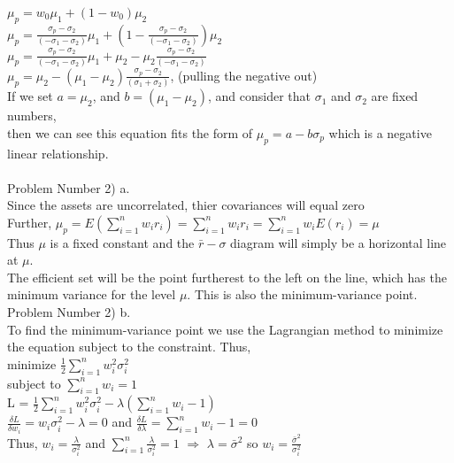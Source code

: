 \documentclass[11pt]{article}
\begin{document}
$\mu_{p} = w_{0}\mu_{1} + (1-w_{0})\mu_{2}$\\
$\mu_{p} = \frac{\sigma_{p} - \sigma_{2}}{(-\sigma_{1} - \sigma_{2})}\mu_{1} + (1-\frac{\sigma_{p} - \sigma_{2}}{(-\sigma_{1} - \sigma_{2})})\mu_{2}$\\
$\mu_{p} = \frac{\sigma_{p} - \sigma_{2}}{(-\sigma_{1} - \sigma_{2})}\mu_{1} + \mu_{2} - \mu_{2}\frac{\sigma_{p} - \sigma_{2}}{(-\sigma_{1} - \sigma_{2})}$\\
$\mu_{p} = \mu_{2} - (\mu_{1} - \mu_{2})\frac{\sigma_{p} - \sigma_{2}}{(\sigma_{1} + \sigma_{2})}$, (pulling the negative out)\\
If we set $a = \mu_{2}$, and $b = (\mu_{1} - \mu_{2})$, and consider that $\sigma_{1}$ and $\sigma_{2}$ are fixed numbers,\\
then we can see this equation fits the form of $\mu_{p} = a - b\sigma_{p}$ which is a negative linear relationship.\\
\\

Problem Number 2) a.\\

Since the assets are uncorrelated, thier covariances will equal zero\\
Further, $\mu_{p} = E(\sum_{i=1}^{n} w_{i}r_{i}) = \sum_{i=1}^{n} w_{i}r_{i} = \sum_{i=1}^{n} w_{i}E(r_{i}) = \mu$\\
Thus $\mu$ is a fixed constant and the $\bar{r}-\sigma$ diagram will simply be a horizontal line at $\mu$.\\
The efficient set will be the point furtherest to the left on the line, which has the minimum variance for the level $\mu$. This is also the minimum-variance point.\\

Problem Number 2) b.\\

To find the minimum-variance point we use the Lagrangian method to minimize the equation subject to the constraint. Thus,\\
minimize $\frac{1}{2}\sum_{i=1}^{n}w_{i}^{2}\sigma_{i}^{2}$\\
subject to $\sum_{i=1}^{n}w_{i} = 1$\\

L = $\frac{1}{2}\sum_{i=1}^{n}w_{i}^{2}\sigma_{i}^{2} - \lambda(\sum_{i=1}^{n}w_{i} - 1)$\\
$\frac{\delta L}{\delta w_{i}} = w_{i}\sigma_{i}^{2} - \lambda = 0$ \hspace{5mm} and \hspace{5mm} $\frac{\delta L}{\delta \lambda} = \sum_{i=1}^{n}w_{i} - 1 = 0$\\
Thus, $w_{i} = \frac{\lambda}{\sigma_{i}^{2}}$ and $\sum_{i=1}^{n} \frac{\lambda}{\sigma_{i}^{2}} = 1$ \hspace{3mm} $\Rightarrow$ \hspace{3mm} $\lambda = \bar{\sigma}^{2}$ \hspace{3mm} so $w_{i} = \frac{\bar{\sigma}^{2}}{\sigma_{i}^{2}}$\\
\end{document}
